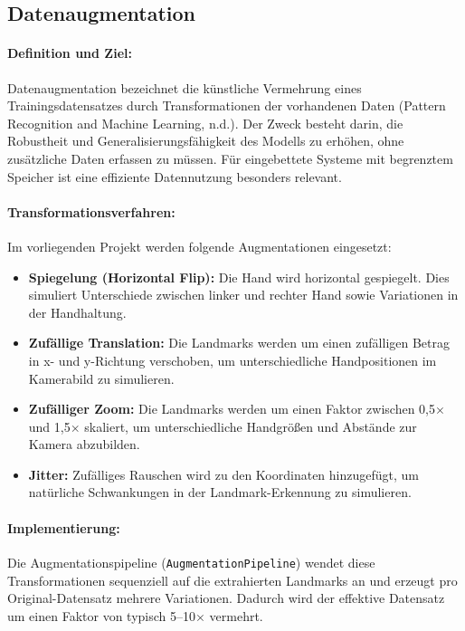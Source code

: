\subsection{Datenaugmentation}

\paragraph{Definition und Ziel:}
Datenaugmentation bezeichnet die künstliche Vermehrung eines Trainingsdatensatzes durch Transformationen der vorhandenen Daten (Pattern Recognition and Machine Learning, n.d.). Der Zweck besteht darin, die Robustheit und Generalisierungsfähigkeit des Modells zu erhöhen, ohne zusätzliche Daten erfassen zu müssen. Für eingebettete Systeme mit begrenztem Speicher ist eine effiziente Datennutzung besonders relevant.

\paragraph{Transformationsverfahren:}
Im vorliegenden Projekt werden folgende Augmentationen eingesetzt:

\begin{itemize}
    \item \textbf{Spiegelung (Horizontal Flip):} Die Hand wird horizontal gespiegelt. Dies simuliert Unterschiede zwischen linker und rechter Hand sowie Variationen in der Handhaltung.
    \item \textbf{Zufällige Translation:} Die Landmarks werden um einen zufälligen Betrag in x- und y-Richtung verschoben, um unterschiedliche Handpositionen im Kamerabild zu simulieren.
    \item \textbf{Zufälliger Zoom:} Die Landmarks werden um einen Faktor zwischen 0,5$\times$ und 1,5$\times$ skaliert, um unterschiedliche Handgrößen und Abstände zur Kamera abzubilden.
    \item \textbf{Jitter:} Zufälliges Rauschen wird zu den Koordinaten hinzugefügt, um natürliche Schwankungen in der Landmark-Erkennung zu simulieren.
\end{itemize}

\paragraph{Implementierung:}
Die Augmentationspipeline (\texttt{AugmentationPipeline}) wendet diese Transformationen sequenziell auf die extrahierten Landmarks an und erzeugt pro Original-Datensatz mehrere Variationen. Dadurch wird der effektive Datensatz um einen Faktor von typisch 5--10$\times$ vermehrt.


